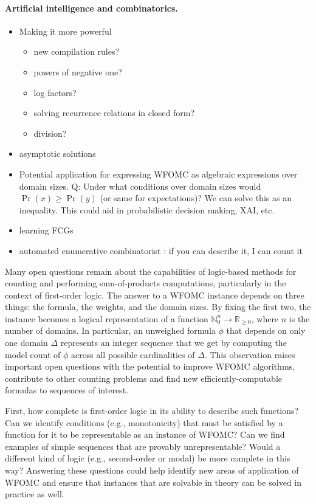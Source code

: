 \paragraph{Artificial intelligence and combinatorics.}
\begin{itemize}
\item Making it more powerful
  \begin{itemize}
  \item new compilation rules?
  \item powers of negative one?
  \item log factors?
  \item solving recurrence relations in closed form?
  \item division?
  \end{itemize}
\item asymptotic solutions
\item Potential application for expressing WFOMC as algebraic expressions over domain sizes. Q: Under what conditions over domain sizes would $\Pr(x) \ge \Pr(y)$ (or same for expectations)? We can solve this as an inequality. This could aid in probabilistic decision making, XAI, etc.
\item learning FCGs
\item automated enumerative combinatorist \citep{DBLP:conf/ilp/BarvinekB0ZK21}: if you can describe it, I can count it
\end{itemize}

Many open questions remain about the capabilities of logic-based methods for counting and performing sum-of-products computations, particularly in the context of first-order logic. The answer to a WFOMC instance depends on three things: the formula, the weights, and the domain sizes. By fixing the first two, the instance becomes a logical representation of a function $\mathbb{N}_0^n \to \mathbb{R}_{\ge 0}$, where $n$ is the number of domains. In particular, an unweighed formula $\phi$ that depends on only one domain $\Delta$ represents an integer sequence that we get by computing the model count of $\phi$ across all possible cardinalities of $\Delta$. This observation raises important open questions with the potential to improve WFOMC algorithms, contribute to other counting problems and find new efficiently-computable formulas to sequences of interest.

First, how complete is first-order logic in its ability to describe such functions? Can we identify conditions (e.g., monotonicity) that must be satisfied by a function for it to be representable as an instance of WFOMC? Can we find examples of simple sequences that are provably unrepresentable? Would a different kind of logic (e.g., second-order or modal) be more complete in this way? Answering these questions could help identify new areas of application of WFOMC and ensure that instances that are solvable in theory can be solved in practice as well.

